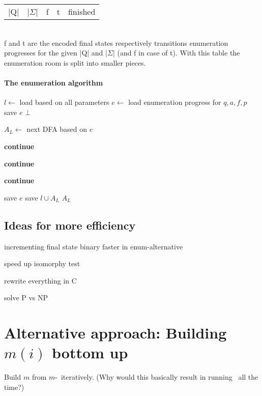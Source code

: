 \begin{tabular}{c c c c c}
	|Q| & |$\Sigma$| & f & t & finished
\end{tabular}\\
f and t are the encoded final states respectively transitions enumeration progresses for the given |Q| and |$\Sigma$| (and f in case of t). With this table the enumeration room is split into smaller pieces.

\paragraph*{The enumeration algorithm}

\vspace{0.2cm}
\begin{algorithmic}[1]
		\State $l \gets$ load based on all parameters
		\State $e \gets$ load enumeration progress for $q, a, f, p$
				\State save $e$
				\State\Return $\bot$
			\EndIf
			
			\State $A_L \gets$ next DFA based on $e$
			
				\State \textbf{continue}
			\EndIf
			
				\State \textbf{continue}
			\EndIf
			
				\State \textbf{continue}
			\EndIf
			
			\State save $e$
			\State save $l \cup A_L$
			\State\Return $A_L$
		\EndWhile
	\EndFunction
\end{algorithmic}
\vspace{0.2cm}

\subsection{Ideas for more efficiency}

incrementing final state binary faster in enum-alternative

speed up isomorphy test

rewrite everything in C

solve P vs NP

\section{Alternative approach: Building $m(i)$ bottom up}

Build $m$ from $m$-\MinMark\ iteratively. (Why would this basically result in running \MinMark\ all the time?)
